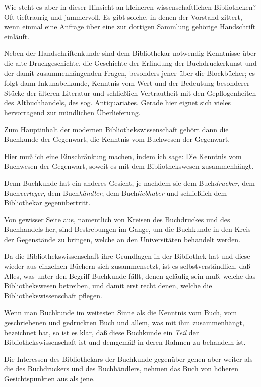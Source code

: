 \documentclass[a4paper,
fontsize=11pt,
oneside,
numbers=noperiodatend,
parskip=half-,
bibliography=totoc,
final
]{scrartcl}
\begin{document}
Wie steht es aber in dieser Hinsicht an kleineren wissenschaftlichen
Bibliotheken? Oft tieftraurig und jammervoll. Es gibt solche, in denen
der Vorstand zittert, wenn einmal eine Anfrage über eine zur dortigen
Sammlung gehörige Handschrift einläuft.

Neben der Handschriftenkunde sind dem Bibliothekar notwendig Kenntnisse
über die alte Druckgeschichte, die Geschichte der Erfindung der
Buchdruckerkunst und der damit zusammenhängenden Fragen, besonders jener
über die Blockbücher; es folgt dann Inkunabelkunde, Kenntnis vom Wert
und der Bedeutung besonderer Stücke der älteren Literatur und
schließlich Vertrautheit mit den Gepflogenheiten des Altbuchhandels, des
sog. Antiquariates. Gerade hier eignet sich vieles hervorragend zur
mündlichen Überlieferung.

Zum Hauptinhalt der modernen Bibliothekswissenschaft gehört dann die
Buchkunde der Gegenwart, die Kenntnis vom Buchwesen der Gegenwart.

Hier muß ich eine Einschränkung machen, indem ich sage: Die Kenntnis vom
Buchwesen der Gegenwart, soweit es mit dem Bibliothekswesen
zusammenhängt.

Denn Buchkunde hat ein anderes Gesicht, je nachdem sie dem
Buch\emph{drucker}, dem Buch\emph{verleger}, dem Buch\emph{händler}, dem
Buch\emph{liebhaber} und schließlich dem Bibliothekar gegenübertritt.

Von gewisser Seite aus, namentlich von Kreisen des Buchdruckes und des
Buchhandels her, sind Bestrebungen im Gange, um die Buchkunde in den
Kreis der Gegenstände zu bringen, welche an den Universitäten behandelt
werden.

Da die Bibliothekswissenschaft ihre Grundlagen in der Bibliothek hat und
diese wieder aus einzelnen Büchern sich zusammensetzt, ist es
selbstverständlich, daß Alles, was unter den Begriff Buchkunde fällt,
denen geläufig sein muß, welche das Bibliothekswesen betreiben, und
damit erst recht denen, welche die Bibliothekswissenschaft pflegen.

Wenn man Buchkunde im weitesten Sinne als die Kenntnis vom Buch, vom
geschriebenen und gedruckten Buch und allem, was mit ihm zusammenhängt,
bezeichnet hat, so ist es klar, daß diese Buchkunde ein \emph{Teil} der
Bibliothekswissenschaft ist und demgemäß in deren Rahmen zu behandeln
ist.

Die Interessen des Bibliothekars der Buchkunde gegenüber gehen aber
weiter als die des Buchdruckers und des Buchhändlers, nehmen das Buch
von höheren Gesichtspunkten aus als jene.
\end{document}
